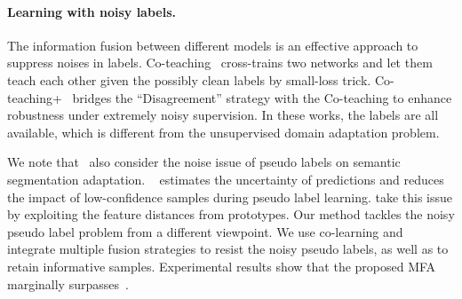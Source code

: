 \documentclass{bmvc2k}
\begin{document}
\paragraph{Learning with noisy labels.}  The information fusion between different models is an effective approach to suppress noises in labels. Co-teaching~\cite{han2018co} cross-trains two networks and let them teach each other given the possibly clean labels by small-loss trick. Co-teaching+~\cite{yu2019does} bridges the “Disagreement” strategy with the Co-teaching to enhance robustness under extremely noisy supervision. In these works, the labels are all available, which is different from the unsupervised domain adaptation problem. 

We note that~\cite{RN132,zhang2021prototypical} also consider the noise issue of pseudo labels on semantic segmentation adaptation. ~\cite{RN132} estimates the uncertainty of predictions and reduces the impact of low-confidence samples during pseudo label learning. \cite{zhang2021prototypical} take this issue by exploiting the feature distances from prototypes. Our method tackles the noisy pseudo label problem from a different viewpoint. We use co-learning and integrate multiple fusion strategies to resist the noisy pseudo labels, as well as to retain informative samples. Experimental results show that the proposed MFA marginally surpasses~\cite{RN132, zhang2021prototypical}.
\end{document}
